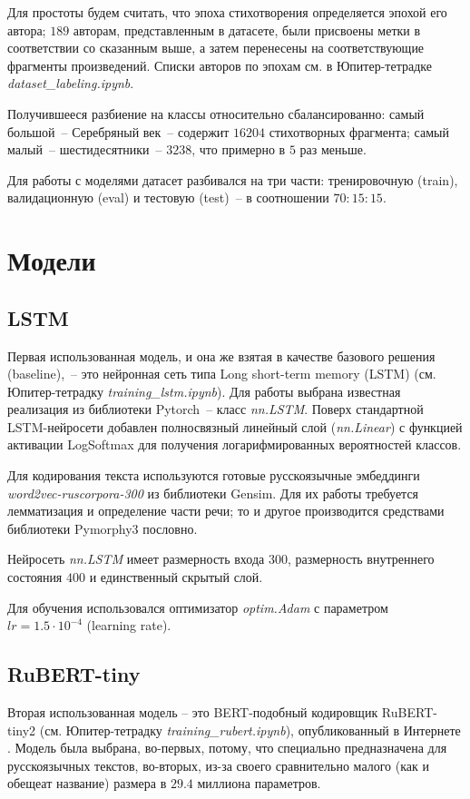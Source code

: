 \documentclass[a4paper,12pt]{article}
\begin{document}
Для простоты будем считать, что эпоха стихотворения определяется эпохой его автора; $189$ авторам, представленным в датасете, были присвоены метки в соответствии со сказанным выше, а затем перенесены на соответствующие фрагменты произведений. Списки авторов по эпохам см. в Юпитер-тетрадке \textit{dataset\_labeling.ipynb}.

Получившееся разбиение на классы относительно сбалансированно: самый большой~-- Серебряный век~-- содержит $16204$ стихотворных фрагмента; самый малый~-- шестидесятники~-- $3238$, что примерно в $5$ раз меньше.

Для работы с моделями датасет разбивался на три части: тренировочную (train), валидационную (eval) и тестовую (test)~-- в соотношении $70:15:15$.


\section{Модели}

\subsection{LSTM}

Первая использованная модель, и она же взятая в качестве базового решения (base\-line),~-- это нейронная сеть типа Long short-term memory (LSTM) (см. Юпитер-тетрадку \textit{training\_lstm.ipynb}). Для работы выбрана известная реализация из библиотеки Pytorch~-- класс \textit{nn.LSTM}. Поверх стандартной LSTM-нейросети добавлен полносвязный линейный слой (\textit{nn.Linear}) с функцией активации LogSoftmax для получения логарифмированных вероятностей классов.

Для кодирования текста используются готовые русскоязычные эмбеддинги \textit{word2vec-ruscorpora-300} из библиотеки Gensim. Для их работы требуется лемматизация и определение части речи; то и другое производится средствами библиотеки Pymorphy3 пословно.

Нейросеть \textit{nn.LSTM} имеет размерность входа $300$, размерность внутреннего состояния $400$ и единственный скрытый слой.

Для обучения использовался оптимизатор \textit{optim.Adam} с параметром $lr = 1.5 \cdot 10^{-4}$ (learning rate).

\subsection{RuBERT-tiny}

Вторая использованная модель -- это BERT-подобный кодировщик RuBERT-tiny2 (см. Юпитер-тетрадку \textit{training\_rubert.ipynb}), опубликованный в Интернете \cite{rubert_model}. Модель была выбрана, во-первых, потому, что специально предназначена для русскоязычных текстов, во-вторых, из-за своего сравнительно малого (как и обещеат название) размера в $29.4$ миллиона параметров.
\end{document}
